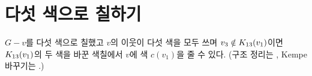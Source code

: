 \section{다섯 색으로 칠하기}\label{sec:five-color}
$G-v$를 다섯 색으로 칠했고 $v$의 이웃이 다섯 색을 모두 쓰며 $v_3 \notin K_{13}(v_1)$이면
$K_{13}(v_1)$의 두 색을 바꾼 색칠에서 $v$에 색 $c(v_1)$을 줄 수 있다.
(구조 정리는 \cite{doe2004structure}, Kempe 바꾸기는 \cite{lorem1988sufficiency}.)
